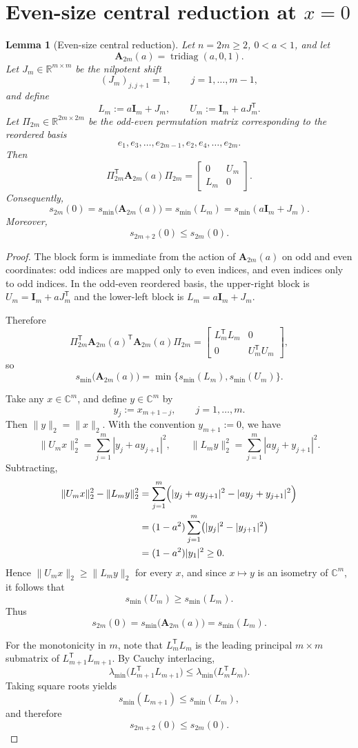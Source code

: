 \documentclass[11pt]{article}
\numberwithin{equation}{section}
\newtheorem{lemma}[theorem]{Lemma}
\newcommand{\R}{\mathbb R}
\newcommand{\C}{\mathbb C}
\newcommand{\A}{\mathbf A}
\newcommand{\I}{\mathbf I}
\newcommand{\tridiag}{\operatorname{tridiag}}
\newcommand{\smin}{s_{\min}}
\begin{document}
\section{Even-size central reduction at \texorpdfstring{\(x=0\)}{x=0}}
\label{app:even-central}

\begin{lemma}[Even-size central reduction]\label{lem:even-central}
Let \(n=2m\ge2\), \(0<a<1\), and let
\[
\A_{2m}(a)=\tridiag(a,0,1).
\]
Let \(J_m\in\R^{m\times m}\) be the nilpotent shift
\[
(J_m)_{j,j+1}=1,\qquad j=1,\dots,m-1,
\]
and define
\[
L_m:=a\I_m+J_m,\qquad U_m:=\I_m+aJ_m^{\mathsf T}.
\]
Let \(\Pi_{2m}\in\R^{2m\times2m}\) be the odd-even permutation matrix corresponding to
the reordered basis
\[
e_1,e_3,\dots,e_{2m-1},e_2,e_4,\dots,e_{2m}.
\]
Then
\[
\Pi_{2m}^{\mathsf T}\A_{2m}(a)\Pi_{2m}
=
\begin{bmatrix}
0 & U_m\\
L_m & 0
\end{bmatrix}.
\]
Consequently,
\[
s_{2m}(0)=\smin\!\bigl(\A_{2m}(a)\bigr)=\smin(L_m)=\smin(a\I_m+J_m).
\]
Moreover,
\[
s_{2m+2}(0)\le s_{2m}(0).
\]
\end{lemma}

\begin{proof}
The block form is immediate from the action of \(\A_{2m}(a)\) on odd and even
coordinates: odd indices are mapped only to even indices, and even indices only to
odd indices.  In the odd-even reordered basis, the upper-right block is
\(U_m=\I_m+aJ_m^{\mathsf T}\) and the lower-left block is \(L_m=a\I_m+J_m\).

Therefore
\[
\Pi_{2m}^{\mathsf T}\A_{2m}(a)^{\mathsf T}\A_{2m}(a)\Pi_{2m}
=
\begin{bmatrix}
L_m^{\mathsf T}L_m & 0\\
0 & U_m^{\mathsf T}U_m
\end{bmatrix},
\]
so
\[
\smin\!\bigl(\A_{2m}(a)\bigr)
=
\min\{\smin(L_m),\smin(U_m)\}.
\]

Take any \(x\in\C^m\), and define \(y\in\C^m\) by
\[
y_j:=x_{m+1-j},\qquad j=1,\dots,m.
\]
Then \(\|y\|_2=\|x\|_2\).  With the convention \(y_{m+1}:=0\), we have
\[
\|U_mx\|_2^2=\sum_{j=1}^m |y_j+a y_{j+1}|^2,
\qquad
\|L_my\|_2^2=\sum_{j=1}^m |a y_j+y_{j+1}|^2.
\]
Subtracting,
\begin{align*}
\|U_mx\|_2^2-\|L_my\|_2^2
&=
\sum_{j=1}^m\Bigl(|y_j+a y_{j+1}|^2-|a y_j+y_{j+1}|^2\Bigr) \\
&=
(1-a^2)\sum_{j=1}^m\bigl(|y_j|^2-|y_{j+1}|^2\bigr) \\
&=
(1-a^2)|y_1|^2\ge0.
\end{align*}
Hence \(\|U_mx\|_2\ge \|L_my\|_2\) for every \(x\), and since \(x\mapsto y\) is an
isometry of \(\C^m\), it follows that
\[
\smin(U_m)\ge \smin(L_m).
\]
Thus
\[
s_{2m}(0)=\smin\!\bigl(\A_{2m}(a)\bigr)=\smin(L_m).
\]

For the monotonicity in \(m\), note that \(L_m^{\mathsf T}L_m\) is the leading principal
\(m\times m\) submatrix of \(L_{m+1}^{\mathsf T}L_{m+1}\).  By Cauchy interlacing,
\[
\lambda_{\min}\!\bigl(L_{m+1}^{\mathsf T}L_{m+1}\bigr)
\le
\lambda_{\min}\!\bigl(L_m^{\mathsf T}L_m\bigr).
\]
Taking square roots yields
\[
\smin(L_{m+1})\le \smin(L_m),
\]
and therefore
\[
s_{2m+2}(0)\le s_{2m}(0).
\]
\end{proof}
\end{document}
